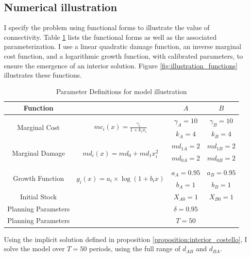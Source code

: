 \subsection{Numerical illustration}

I specify the problem using functional forms to illustrate the value of connectivity. Table \ref{table:functions_and_parameters} lists the functional forms as well as the associated parameterization. I use a linear quadratic damage function, an inverse marginal cost function, and a logarithmic growth function, with calibrated parameters, to ensure the emergence of an interior solution. Figure \ref{fig:illustration_functions} illustrates these functions. 

\begin{table}[h!]
\centering
\begin{tabular}{|c|c|c|c|}
\hline
\textbf{Function} & \textbf{} & \textbf{$A$} & \textbf{$B$} \\ \hline
\multirow{2}{*}{Marginal Cost} & \multirow{2}{*}{$mc_i(x) = \frac{\gamma_i}{1+ k_ix_i}$} & $\gamma_A = 10$ & $\gamma_B = 10$ \\ 
 &  & $k_A = 4$ & $k_B = 4$ \\ \hline\hline
\multirow{3}{*}{Marginal Damage} & \multirow{3}{*}{$md_i(x) = md_0 + md_1 x_i^2$} & $md_{1A} = 2$ & $md_{1B} = 2$ \\ 
 &  & $md_{0A} = 2$ & $md_{0B} = 2$ \\ 
 &  &  &  \\ \hline\hline
\multirow{2}{*}{Growth Function} & \multirow{2}{*}{$g_i(x) = a_i \times \log(1+b_i x)$} & $a_A = 0.95$ & $a_B = 0.95$ \\ 
 &  & $b_A = 1$ & $b_B = 1$ \\ \hline\hline
\multirow{1}{*}{Initial Stock} & \multirow{1}{*}{} & $X_{A0} = 1$ & $X_{B0} = 1$ \\ \hline\hline
\multirow{1}{*}{Planning Parameters} & \multirow{1}{*}{} & $\delta = 0.95$ &  \\ 
\multirow{1}{*}{Planning Parameters} & \multirow{1}{*}{} & $T = 50$ & \\ \hline
\end{tabular}
\caption{Parameter Definitions for model illustration}
\label{table:functions_and_parameters}
\end{table}

Using the implicit solution defined in proposition \ref{proposition:interior_costello}, I solve the model over $T=50$ periods, using the full range of $d_{AB}$ and $d_{BA}$.

